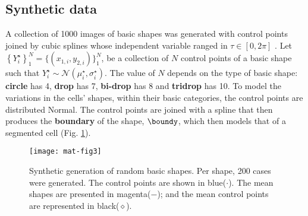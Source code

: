 \subsection{Synthetic data}
A collection of 1000 images of basic shapes was generated with control
points joined by cubic splines whose independent variable ranged in
$\tau\in[0,2\pi]$
. %
Let $\left\{Y^{\star}_i\right\}_{1}^{N} = \{(x_{1,i}, y_{2,i})\}_{1}^{N}$,
be a collection of $N$ control points of a basic shape such that
$Y^{\star}_i \sim \mathcal{N}\left( \mu^{\star}_i, \sigma^{\star}_i \right) $.
The value of $N$ depends on the type of basic shape: \textbf{circle} has 4,
\textbf{drop} has 7, \textbf{bi-drop} has 8 and \textbf{tridrop} has 10.
To model the variations in the cells' shapes, within their basic categories,
the control points are distributed Normal. The control points are joined with a
spline that then produces the \textbf{boundary} of the shape, $\boundy$, which then
models that of a segmented cell (Fig. \ref{fig:mat-synth}).
\begin{figure}[hbpt]
    \centering
    \texttt{[image: mat-fig3]}
    \caption[Synthetic generation of random basic shapes.]{\small
    Synthetic generation of random basic shapes.
    Per shape, 200 cases were generated.
    The control points are shown in blue($\cdot$).
    The mean shapes are presented in magenta($-$); and the
    mean control points are represented in black($\diamond$).
    }
    \label{fig:mat-synth}
\end{figure}
\vspace{-1.5em}
